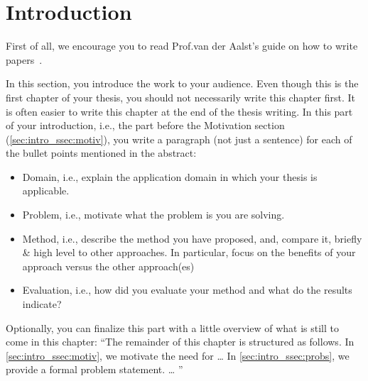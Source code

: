 \chapter{Introduction}
\label{chap:intro}
First of all, we encourage you to read Prof.\@ van der Aalst's guide on how to write papers~\autocite{beautiful}.

In this section, you introduce the work to your audience.
Even though this is the first chapter of your thesis, you should not necessarily write this chapter first.
It is often easier to write this chapter at the end of the thesis writing.
In this part of your introduction, i.e., the part before the Motivation section (\cref{sec:intro_ssec:motiv}), you write a paragraph (not just a sentence) for each of the bullet points mentioned in the abstract:

\begin{itemize}
	\item Domain, i.e., explain the application domain in which your thesis is applicable.
	\item Problem, i.e., motivate what the problem is you are solving.
	\item Method, i.e., describe the method you have proposed, and, compare it, briefly \& high level to other approaches. In particular, focus on the benefits of your approach versus the other approach(es)
	\item Evaluation, i.e., how did you evaluate your method and what do the results indicate?
\end{itemize}

Optionally, you can finalize this part with a little overview of what is still to come in this chapter:
\enquote{The remainder of this chapter is structured as follows.
	In \cref{sec:intro_ssec:motiv}, we motivate the need for \dots{}
	In \cref{sec:intro_ssec:probs}, we provide a formal problem statement.
	\dots
}

